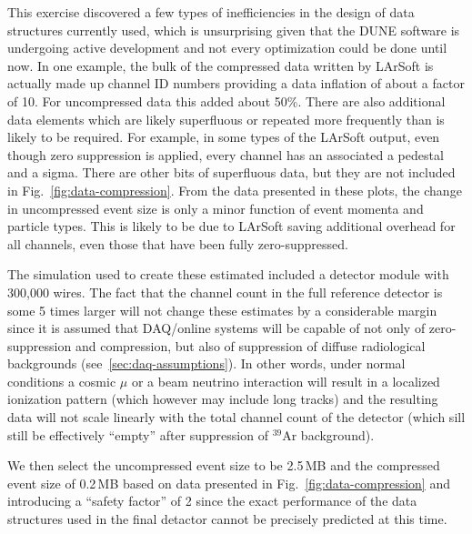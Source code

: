 This exercise discovered a few types of inefficiencies in the design of data structures
currently used, which is unsurprising given that the DUNE software is undergoing active development
and not every optimization could be done until now. In one example, the bulk of the
compressed data written by LArSoft is actually made up channel ID
numbers providing a data inflation of about a factor of 10.
For uncompressed data this added about 50\%.
There are also additional data elements which are likely superfluous or
repeated more frequently than is likely to be required.
For example, in some types of the LArSoft output, even though zero suppression is applied, every
channel has an associated a pedestal and a sigma. There are other bits of superfluous data, but
they are not included in Fig.~\ref{fig:data-compression}. From the data presented in these
plots, the change in uncompressed event size is only a minor function of event momenta and
particle types. This is likely to be due to LArSoft saving additional overhead for all
channels, even those that have been fully zero-suppressed.

The simulation used to create these estimated included a detector module with
300,000 wires. The fact that the channel count in the full reference detector is
some 5 times larger will not change these estimates by a considerable margin
since it is assumed that DAQ/online systems will be capable of
not only of zero-suppression and compression, but also of suppression
of diffuse radiological backgrounds (see~\ref{sec:daq-assumptions}).
In other words, under normal conditions a cosmic $\mu$ or a beam
neutrino interaction will result in a localized ionization pattern (which
however may include long tracks) and the resulting data will not
scale linearly with the total channel count of the detector (which
sill still be effectively ``empty'' after suppression of $^{39}$Ar
background).

We then select the uncompressed event size to be 2.5\,MB and
the compressed event size of 0.2\,MB based
on data presented in Fig.~\ref{fig:data-compression} and
introducing a ``safety factor'' of 2 since the exact performance
of the data structures used in the final detactor cannot be precisely predicted at this time.

